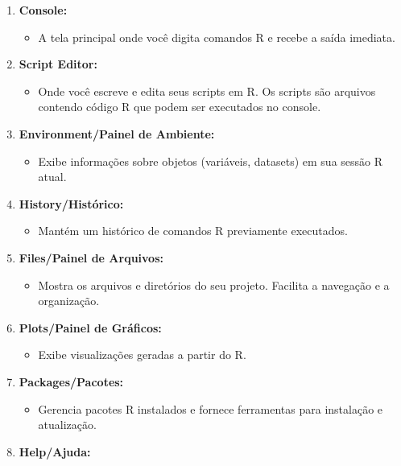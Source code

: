 \documentclass[
  letterpaper,
  DIV=11,
  numbers=noendperiod]{scrartcl}
\providecommand{\tightlist}{%
  \setlength{\itemsep}{0pt}\setlength{\parskip}{0pt}}\usepackage{longtable,booktabs,array}
\begin{document}
\begin{enumerate}
\def\labelenumi{\arabic{enumi}.}
\item
  \textbf{Console:}

  \begin{itemize}
  \tightlist
  \item
    A tela principal onde você digita comandos R e recebe a saída
    imediata.
  \end{itemize}
\item
  \textbf{Script Editor:}

  \begin{itemize}
  \tightlist
  \item
    Onde você escreve e edita seus scripts em R. Os scripts são arquivos
    contendo código R que podem ser executados no console.
  \end{itemize}
\item
  \textbf{Environment/Painel de Ambiente:}

  \begin{itemize}
  \tightlist
  \item
    Exibe informações sobre objetos (variáveis, datasets) em sua sessão
    R atual.
  \end{itemize}
\item
  \textbf{History/Histórico:}

  \begin{itemize}
  \tightlist
  \item
    Mantém um histórico de comandos R previamente executados.
  \end{itemize}
\item
  \textbf{Files/Painel de Arquivos:}

  \begin{itemize}
  \tightlist
  \item
    Mostra os arquivos e diretórios do seu projeto. Facilita a navegação
    e a organização.
  \end{itemize}
\item
  \textbf{Plots/Painel de Gráficos:}

  \begin{itemize}
  \tightlist
  \item
    Exibe visualizações geradas a partir do R.
  \end{itemize}
\item
  \textbf{Packages/Pacotes:}

  \begin{itemize}
  \tightlist
  \item
    Gerencia pacotes R instalados e fornece ferramentas para instalação
    e atualização.
  \end{itemize}
\item
  \textbf{Help/Ajuda:}


\end{enumerate}
\end{document}
